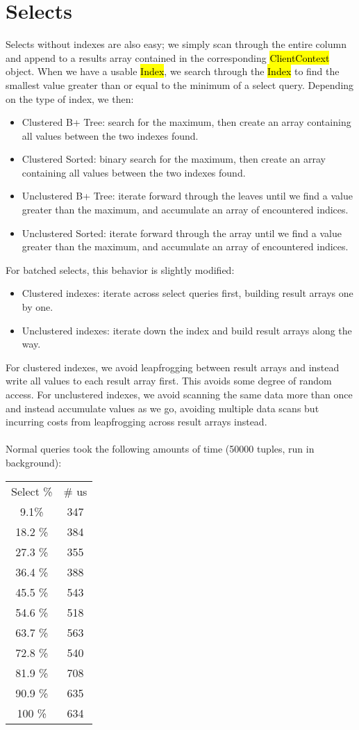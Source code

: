 \documentclass[paper=letter, fontsize=11pt]{scrartcl}
\numberwithin{equation}{section}
\numberwithin{figure}{section}
\numberwithin{table}{section}
\newcommand{\ttt}[1]{\hl{\ttfamily #1}}
\begin{document}
\section{Selects}
Selects without indexes are also easy; we simply scan through the entire column and append to a results array contained in the corresponding \ttt{ClientContext} object.  When we have a usable \ttt{Index}, we search through the \ttt{Index} to find the smallest value greater than or equal to the minimum of a select query.  Depending on the type of index, we then:
\begin{itemize}
\item Clustered B+ Tree: search for the maximum, then create an array containing all values between the two indexes found.
\item Clustered Sorted: binary search for the maximum, then create an array containing all values between the two indexes found.
\item Unclustered B+ Tree: iterate forward through the leaves until we find a value greater than the maximum, and accumulate an array of encountered indices.
\item Unclustered Sorted: iterate forward through the array until we find a value greater than the maximum, and accumulate an array of encountered indices.
\end{itemize}

For batched selects, this behavior is slightly modified:
\begin{itemize}
\item Clustered indexes: iterate across select queries first, building result arrays one by one.
\item Unclustered indexes: iterate down the index and build result arrays along the way.
\end{itemize}
For clustered indexes, we avoid leapfrogging between result arrays and instead write all values to each result array first.  This avoids some degree of random access.  For unclustered indexes, we avoid scanning the same data more than once and instead accumulate values as we go, avoiding multiple data scans but incurring costs from leapfrogging across result arrays instead.
\\\\Normal queries took the following amounts of time (50000 tuples, run in background):
\begin{table}[h!]
\centering
\begin{tabular}{c | c}
Select \% & \# us \\
9.1\% & 347 \\
18.2 \% & 384 \\
27.3 \% & 355 \\
36.4 \% & 388 \\
45.5 \% & 543 \\
54.6 \% & 518 \\
63.7 \% & 563 \\
72.8 \% & 540 \\
81.9 \% & 708 \\
90.9 \% & 635 \\
100 \% & 634
\end{tabular}
\end{table}
\end{document}
